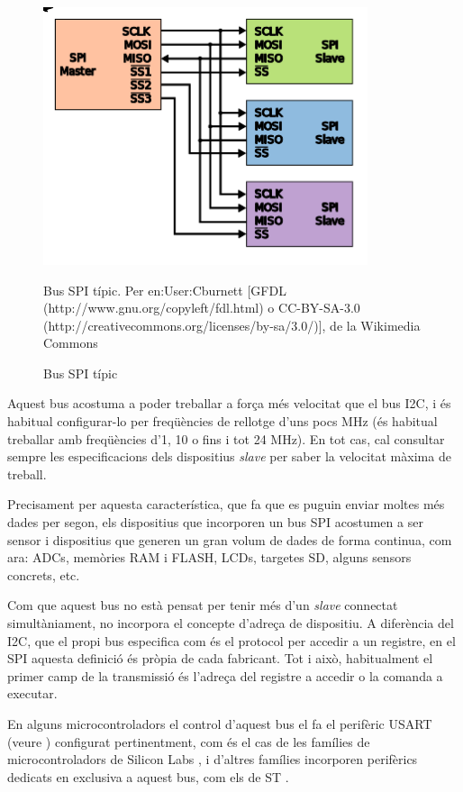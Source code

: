\begin{figure}
 \centering
 \includegraphics[width=0.85\textwidth, keepaspectratio]{imatges/SPI_three_slaves.png}
 \caption{Bus SPI típic}{Bus SPI típic. Per en:User:Cburnett [GFDL (http://www.gnu.org/copyleft/fdl.html) o CC-BY-SA-3.0 (http://creativecommons.org/licenses/by-sa/3.0/)], de la Wikimedia Commons}
 \label{fig:SPI}
\end{figure}




Aquest bus acostuma a poder treballar a força més velocitat que el bus \gls{I2C}, i és habitual configurar-lo per freqüències de rellotge d'uns pocs MHz (és habitual treballar amb freqüències d'1, 10 o fins i tot 24 MHz). En tot cas, cal consultar sempre les especificacions dels dispositius {\em slave} per saber la velocitat màxima de treball.

Precisament per aquesta característica, que fa que es puguin enviar moltes més dades per segon, els dispositius que incorporen un bus SPI acostumen a ser sensor i dispositius que generen un gran volum de dades de forma continua, com ara: \glspl{ADC}, memòries RAM i \gls{FLASH}, LCDs, targetes SD,  alguns sensors concrets, etc.

Com que aquest bus no està pensat per tenir més d'un {\em slave} connectat simultàniament, no incorpora el concepte d'adreça de dispositiu. A diferència del \gls{I2C}, que el propi bus especifica com és el protocol per accedir a un registre, en el SPI aquesta definició és pròpia de cada fabricant. Tot i això, habitualment el primer camp de la transmissió és l'adreça del registre a accedir o la comanda a executar.

En alguns microcontroladors el control d'aquest bus el fa el perifèric USART (veure ) configurat pertinentment, com és el cas de les famílies de microcontroladors de Silicon Labs \cite[207]{EFM32GRM}, i d'altres famílies incorporen perifèrics dedicats en exclusiva a aquest bus, com els de ST \cite[873]{STM32F4RM}.

